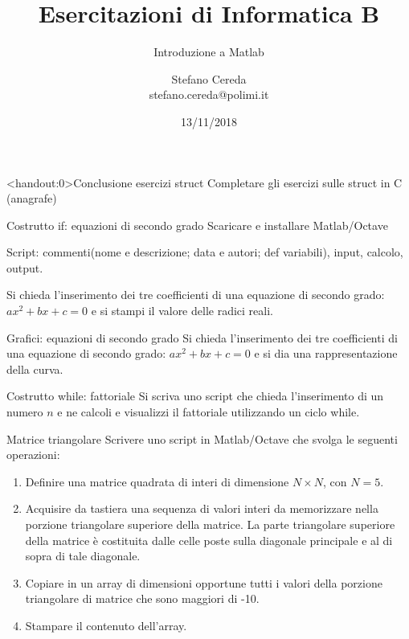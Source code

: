 \documentclass[format=169, handout]{beamer}
\title{Esercitazioni di Informatica B}
\subtitle{Introduzione a Matlab}
\author{Stefano Cereda\\
	stefano.cereda@polimi.it
}
\date{13/11/2018}
\institute[PoliMi]{\vspace{0.5cm}\centering Politecnico di Milano \\ \vspace{0.2cm}
	\texttt{[image: ../logopolimi]}}
\begin{document}
	\begin{frame}
	\maketitle
\end{frame}

\begin{frame}<handout:0>{Conclusione esercizi struct}
Completare gli esercizi sulle struct in C (anagrafe)
\end{frame}


\begin{frame}{Costrutto if: equazioni di secondo grado}
Scaricare e installare Matlab/Octave

Script: commenti(nome e descrizione; data e autori; def variabili), input, calcolo, output.

Si chieda l’inserimento dei tre coefficienti di una equazione di secondo grado: $ax^2+bx+c=0$ e si stampi il valore delle radici reali.
\end{frame}

\begin{frame}{Grafici: equazioni di secondo grado}
Si chieda l’inserimento dei tre coefficienti di una equazione di secondo grado: $ax^2+bx+c=0$ e si dia una rappresentazione della curva.
\end{frame}

\begin{frame}{Costrutto while: fattoriale}
Si scriva uno script che chieda l'inserimento di un numero $n$ e ne calcoli e visualizzi il fattoriale utilizzando un ciclo while.
\end{frame}

\begin{frame}{Matrice triangolare}
Scrivere uno script in Matlab/Octave che svolga le seguenti operazioni:
\begin{enumerate}
	\item Definire una matrice quadrata di interi di dimensione $N\times N$, con $N=5$.
	\item Acquisire da tastiera una sequenza di valori interi da memorizzare nella porzione triangolare superiore della matrice. La parte triangolare superiore della matrice è costituita dalle celle poste sulla diagonale principale e al di sopra di tale diagonale.
	\item Copiare in un array di dimensioni opportune tutti i valori della porzione triangolare di matrice che sono maggiori di -10.
	\item Stampare il contenuto dell'array.
\end{enumerate}
\end{frame}
\end{document}
